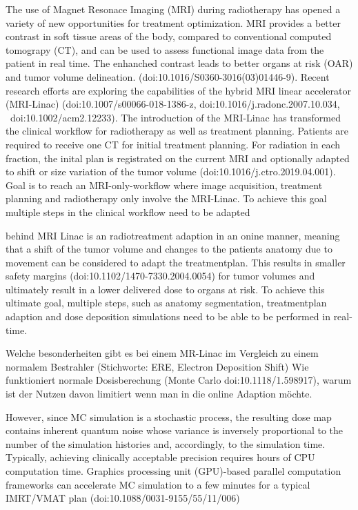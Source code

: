 The use of Magnet Resonace Imaging (MRI) during radiotherapy has opened a variety of new opportunities for treatment optimization. MRI provides a better contrast in soft tissue areas of the body, compared to conventional computed tomograpy (CT), and can be used to assess functional image data from the patient in real time. The enhanched contrast leads to better organs at risk (OAR) and tumor volume delineation. (doi:10.1016/S0360-3016(03)01446-9). Recent research efforts are exploring the capabilities of the hybrid MRI linear accelerator (MRI-Linac) (doi:10.1007/s00066-018-1386-z, doi:10.1016/j.radonc.2007.10.034,  doi:10.1002/acm2.12233). The introduction of the MRI-Linac has transformed the clinical workflow for radiotherapy as well as treatment planning. Patients are required to receive one CT for initial treatment planning. For radiation in each fraction, the inital plan is registrated on the current MRI and optionally adapted to shift or size variation of the tumor volume (doi:10.1016/j.ctro.2019.04.001). Goal is to reach an MRI-only-workflow where image acquisition, treatment planning and radiotherapy only involve the MRI-Linac. To achieve this goal multiple steps in the clinical workflow need to be adapted

behind MRI Linac is an radiotreatment adaption in an onine manner, meaning that a shift of the tumor volume and changes to the patients anatomy due to movement can be considered to adapt the treatmentplan. This results in smaller safety margins (doi:10.1102/1470-7330.2004.0054) for tumor volumes and ultimately result in a lower delivered dose to organs at risk. To achieve this ultimate goal, multiple steps, such as anatomy segmentation, treatmentplan adaption and dose deposition simulations need to be able to be performed in real-time. 

Welche besonderheiten gibt es bei einem MR-Linac im Vergleich zu einem normalem Bestrahler (Stichworte: ERE, Electron Deposition Shift)
Wie funktioniert normale Dosisberechung (Monte Carlo doi:10.1118/1.598917), warum ist der Nutzen davon limitiert wenn man in die online Adaption möchte. 

However, since MC simulation is a stochastic process, the resulting dose map contains inherent quantum noise whose variance is inversely proportional to the number of the simulation histories and, accordingly, to the simulation time. Typically, achieving clinically acceptable precision requires hours of CPU computation time. Graphics processing unit (GPU)-based parallel computation frameworks can accelerate MC simulation to a few minutes for a typical IMRT/VMAT plan (doi:10.1088/0031-9155/55/11/006)

